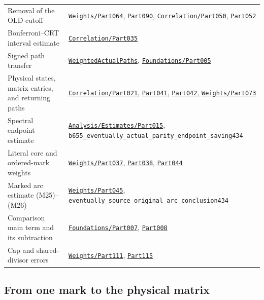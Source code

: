 \begin{longtable}[]{@{}
  >{\raggedright\arraybackslash}p{}
  >{\raggedright\arraybackslash}p{}@{}}
Removal of the OLD cutoff &
\href{../Green64/Library/Weights/Part064.lean}{\nolinkurl{Weights/Part064}},
\href{../Green64/Library/Weights/Part090.lean}{\nolinkurl{Part090}},
\href{../Green64/Library/Correlation/Part050.lean}{\nolinkurl{Correlation/Part050}},
\href{../Green64/Library/Correlation/Part052.lean}{\nolinkurl{Part052}} \\
Bonferroni--CRT interval estimate &
\href{../Green64/Library/Correlation/Part035.lean}{\nolinkurl{Correlation/Part035}} \\
Signed path transfer &
\href{../Green64/Library/Weights/WeightedActualPaths.lean}{\nolinkurl{WeightedActualPaths}},
\href{../Green64/Library/Sieve/Foundations/Part005.lean}{\nolinkurl{Foundations/Part005}} \\
Physical states, matrix entries, and returning paths &
\href{../Green64/Library/Correlation/Part021.lean}{\nolinkurl{Correlation/Part021}},
\href{../Green64/Library/Correlation/Part041.lean}{\nolinkurl{Part041}},
\href{../Green64/Library/Correlation/Part042.lean}{\nolinkurl{Part042}},
\href{../Green64/Library/Weights/Part073.lean}{\nolinkurl{Weights/Part073}} \\
Spectral endpoint estimate &
\href{../Green64/Library/Analysis/Estimates/Part015.lean}{\nolinkurl{Analysis/Estimates/Part015}},
{\small\nolinkurl{b655_eventually_actual_parity_endpoint_saving434}} \\
Literal core and ordered-mark weights &
\href{../Green64/Library/Weights/Part037.lean}{\nolinkurl{Weights/Part037}},
\href{../Green64/Library/Weights/Part038.lean}{\nolinkurl{Part038}},
\href{../Green64/Library/Weights/Part044.lean}{\nolinkurl{Part044}} \\
Marked arc estimate (M25)--(M26) &
\href{../Green64/Library/Weights/Part045.lean}{\nolinkurl{Weights/Part045}},
{\small\nolinkurl{eventually_source_original_arc_conclusion434}} \\
Comparison main term and its subtraction &
\href{../Green64/Library/Sieve/Foundations/Part007.lean}{\nolinkurl{Foundations/Part007}},
\href{../Green64/Library/Sieve/Foundations/Part008.lean}{\nolinkurl{Part008}} \\
Cap and shared-divisor errors &
\href{../Green64/Library/Weights/Part111.lean}{\nolinkurl{Weights/Part111}},
\href{../Green64/Library/Weights/Part115.lean}{\nolinkurl{Part115}} \\
\end{longtable}


\hypertarget{physical-lift-source-correspondence}{%
\subsection{From one mark to the physical
matrix}\label{physical-lift-source-correspondence}}

